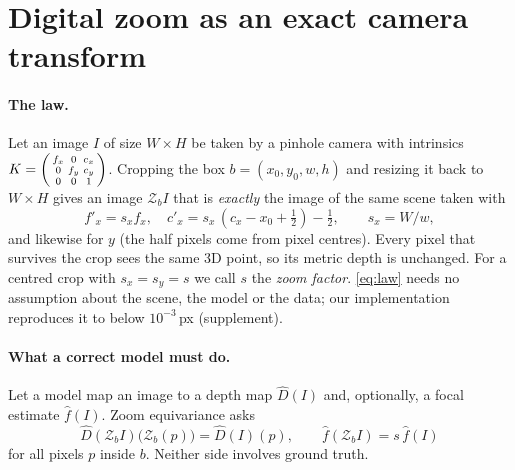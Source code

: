 \section{Digital zoom as an exact camera transform}
\label{sec:law}

\paragraph{The law.}
Let an image $I$ of size $W\times H$ be taken by a pinhole camera with intrinsics
$K=\begin{psmallmatrix} f_x & 0 & c_x\\ 0 & f_y & c_y\\ 0&0&1\end{psmallmatrix}$.
Cropping the box $b=(x_0,y_0,w,h)$ and resizing it back to $W\times H$ gives an image
$\mathcal{Z}_b I$ that is \emph{exactly} the image of the same scene taken with
\begin{equation}
  f'_x = s_x f_x,\quad c'_x = s_x\,(c_x - x_0 + \tfrac12) - \tfrac12,\qquad s_x = W/w,
  \label{eq:law}
\end{equation}
and likewise for $y$ (the half pixels come from pixel centres).
Every pixel that survives the crop sees the same 3D point, so its metric depth is unchanged.
For a centred crop with $s_x=s_y=s$ we call $s$ the \emph{zoom factor}.
\cref{eq:law} needs no assumption about the scene, the model or the data;
our implementation reproduces it to below $10^{-3}$\,px (supplement).

\paragraph{What a correct model must do.}
Let a model map an image to a depth map $\hat D(I)$ and, optionally, a focal estimate
$\hat f(I)$. Zoom equivariance asks
\begin{equation}
  \hat D(\mathcal{Z}_b I)\big(\mathcal{Z}_b(p)\big) = \hat D(I)(p), \qquad
  \hat f(\mathcal{Z}_b I) = s\,\hat f(I)
  \label{eq:equiv}
\end{equation}
for all pixels $p$ inside $b$. Neither side involves ground truth.

